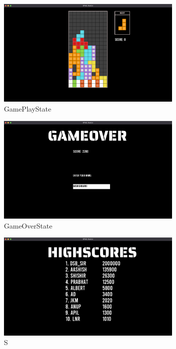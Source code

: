 \begin{figure}[H]
	\centering
	\includegraphics[width=0.8\textwidth]{images/GamePlayState.png}
	\caption{GamePlayState}
\end{figure}
\begin{figure}[H]
	\centering
	\includegraphics[width=0.8\textwidth]{images/GameOverState.png}
	\caption{GameOverState}
\end{figure}
\begin{figure}[H]
	\centering
	\includegraphics[width=0.8\textwidth]{images/HighScoreState.png}
	\caption{S}
\end{figure}

